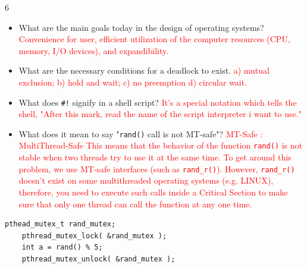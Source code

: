 \documentclass[9pt,landscape]{memoir}
\newcommand{\answer}[1]{\textcolor{red}{#1}}
\begin{document}
\begin{multicols}{6}
\begin{itemize}
    \item What are the main goals today in the design of operating systems? \answer{Convenience for user, efficient utilization of the computer resources (CPU, memory, I/O devices), and expandibility.}
    \item What are the necessary conditions for a deadlock to exist. \answer{a) mutual exclusion; b) hold and wait; c) no preemption d) circular wait.}
    \item What does \verb$#!$ signify in a shell script? \answer{It's a special notation which tells the shell, "After this mark, read the name of the script interpreter i want to use."}
    \item What does it mean to say "\verb$rand()$ call is not MT-safe"? \answer{MT-Safe : MultiThread-Safe This means that the behavior of the function \texttt{rand()} is not stable when two threads try to use it at the same time. To get around this problem, we use MT-safe interfaces (such as \texttt{rand\_r()}). However, \texttt{rand\_r()} doesn't exist on some multithreaded operating systems (e.g. LINUX), therefore, you need to execute such calls inside a Critical Section to make sure that only one thread can call the function at any one time.}
\end{itemize}

\begin{lstlisting}[style=cC++,aboveskip=1pt,belowskip=1pt]
    pthead_mutex_t rand_mutex;
    pthread_mutex_lock( &rand_mutex );
    int a = rand() % 5;
    pthread_mutex_unlock( &rand_mutex );
\end{lstlisting}


\end{multicols}
\end{document}
